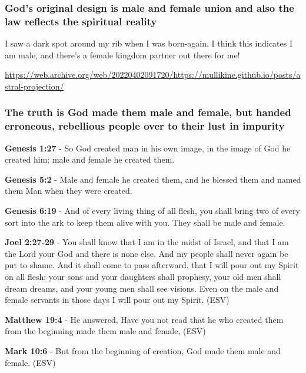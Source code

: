 \documentclass[11pt]{article}
\begin{document}
\subsubsection{God's original design is male and female union and also the law reflects the spiritual reality}
\label{sec:org14d49ca}

I saw a dark spot around my rib when I was born-again.
I think this indicates I am male, and there's a female kingdom partner out there for me!

\url{https://web.archive.org/web/20220402091720/https://mullikine.github.io/posts/astral-projection/}

\subsubsection{The truth is God made them male and female, but handed erroneous, rebellious people over to their lust in impurity}
\label{sec:org226f20a}
\textbf{Genesis 1:27} - So God created man in his own image, in the image of God he created him; male and female he created them.

\textbf{Genesis 5:2} - Male and female he created them, and he blessed them and named them Man when they were created.

\textbf{Genesis 6:19} - And of every living thing of all flesh, you shall bring two of every sort into the ark to keep them alive with you. They shall be male and female.

\textbf{Joel 2:27-29} - You shall know that I am in the midst of Israel, and that I am the Lord your God and there is none else. And my people shall never again be put to shame.  And it shall come to pass afterward, that I will pour out my Spirit on all flesh; your sons and your daughters shall prophesy, your old men shall dream dreams, and your young men shall see visions.  Even on the male and female servants in those days I will pour out my Spirit. (ESV)

\textbf{Matthew 19:4} - He answered, Have you not read that he who created them from the beginning made them male and female, (ESV)

\textbf{Mark 10:6} - But from the beginning of creation, God made them male and female. (ESV)
\end{document}
